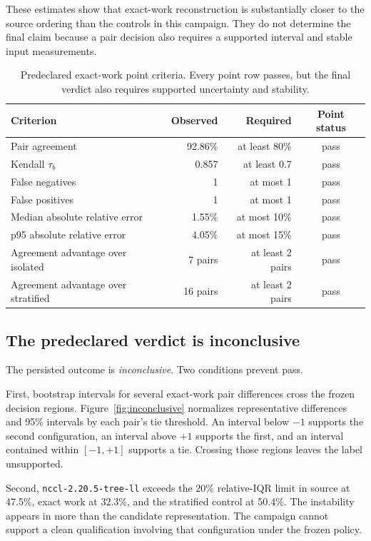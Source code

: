 \documentclass[10pt,twocolumn]{article}
\begin{document}
These estimates show that exact-work reconstruction is substantially closer to
the source ordering than the controls in this campaign. They do not determine
the final claim because a pair decision also requires a supported interval and
stable input measurements.

\begin{table}[t]
\caption{Predeclared exact-work point criteria. Every point row passes, but the
final verdict also requires supported uncertainty and stability.}
\label{tab:criteria}
\centering\small
\begin{tabular}{@{}lrrc@{}}
\toprule
Criterion & Observed & Required & Point status \\
\midrule
Pair agreement & 92.86\% & at least 80\% & pass \\
Kendall $\tau_b$ & 0.857 & at least 0.7 & pass \\
False negatives & 1 & at most 1 & pass \\
False positives & 1 & at most 1 & pass \\
Median absolute relative error & 1.55\% & at most 10\% & pass \\
p95 absolute relative error & 4.05\% & at most 15\% & pass \\
Agreement advantage over isolated & 7 pairs & at least 2 pairs & pass \\
Agreement advantage over stratified & 16 pairs & at least 2 pairs & pass \\
\bottomrule
\end{tabular}
\end{table}

\subsection{The predeclared verdict is inconclusive}

The persisted outcome is \emph{inconclusive}. Two conditions prevent pass.

First, bootstrap intervals for several exact-work pair differences cross the
frozen decision regions. Figure~\ref{fig:inconclusive} normalizes representative
differences and 95\% intervals by each pair's tie threshold. An interval below
$-1$ supports the second configuration, an interval above $+1$ supports the
first, and an interval contained within $[-1,+1]$ supports a tie. Crossing
those regions leaves the label unsupported.

Second, \texttt{nccl-2.20.5-tree-ll} exceeds the 20\% relative-IQR limit in
source at 47.5\%, exact work at 32.3\%, and the stratified control at 50.4\%.
The instability appears in more than the candidate representation. The
campaign cannot support a clean qualification involving that configuration
under the frozen policy.
\end{document}
